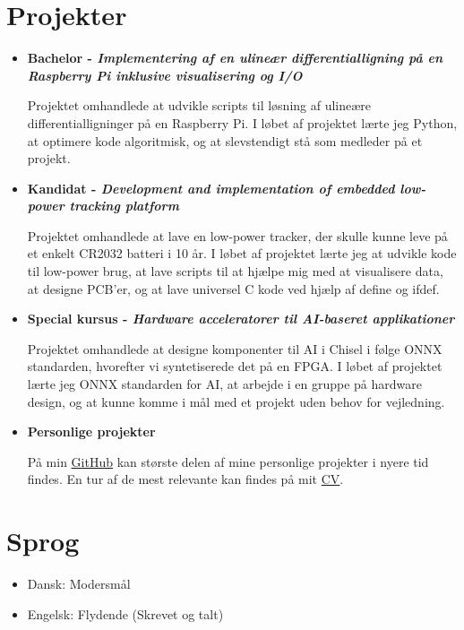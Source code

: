 \section{Projekter}
	\begin{itemize}
		\item \textbf{Bachelor - \textit{Implementering af en ulineær differentialligning på en Raspberry Pi inklusive visualisering og I/O}}

			Projektet omhandlede at udvikle scripts til løsning af ulineære differentialligninger på en Raspberry Pi.
			I løbet af projektet lærte jeg Python, at optimere kode algoritmisk, og at slevstendigt stå som medleder på et projekt.

		\item \textbf{Kandidat - \textit{Development and implementation of embedded low-power tracking platform}}

			Projektet omhandlede at lave en low-power tracker, der skulle kunne leve på et enkelt CR2032 batteri i 10 år.
			I løbet af projektet lærte jeg at udvikle kode til low-power brug, at lave scripts til at hjælpe mig med at visualisere data, at designe PCB'er, og at lave universel C kode ved hjælp af define og ifdef.

		\item \textbf{Special kursus - \textit{Hardware acceleratorer til AI-baseret applikationer}}

			Projektet omhandlede at designe komponenter til AI i Chisel i følge ONNX standarden, hvorefter vi syntetiserede det på en FPGA.
			I løbet af projektet lærte jeg ONNX standarden for AI, at arbejde i en gruppe på hardware design, og at kunne komme i mål med et projekt uden behov for vejledning.

		\item \textbf{Personlige projekter}
			
			På min \href{https://github.com/jondalnas}{GitHub} kan største delen af mine personlige projekter i nyere tid findes.
			En tur af de mest relevante kan findes på mit \href{https://github.com/jondalnas/CV}{CV}.
	\end{itemize}

\section{Sprog}
	\begin{itemize}
		\item Dansk: Modersmål
		\item Engelsk: Flydende (Skrevet og talt)
	\end{itemize}

